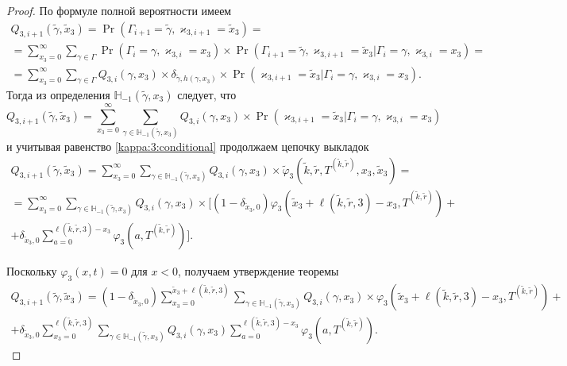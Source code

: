 \documentclass[a4paper,12pt,russian]{extarticle}
\begin{document}
\begin{proof}
По формуле полной вероятности имеем
\begin{multline*}
Q_{3,i+1}(\tilde{\gamma},\tilde{x}_3) = \Pr(\Gamma_{i+1}=\tilde{\gamma}, \varkappa_{3,i+1}=\tilde{x}_3) = \\
= \sum_{x_3=0}^{\infty}\sum_{\gamma \in \Gamma} \Pr(\Gamma_{i}=\gamma, \varkappa_{3,i}=x_3) \times \Pr(\Gamma_{i+1}=\tilde{\gamma}, \varkappa_{3,i+1}=\tilde{x}_3 | \Gamma_{i}=\gamma, \varkappa_{3,i}=x_3) =  \\ 
= \sum_{x_3=0}^{\infty}\sum_{\gamma \in \Gamma} Q_{3,i}(\gamma,x_3) \times \delta_{\tilde{\gamma},h(\gamma,x_3)}\times
\Pr(\varkappa_{3,i+1}=\tilde{x}_3 | \Gamma_{i}=\gamma, \varkappa_{3,i}=x_3).
\end{multline*}
Тогда из определения $ {\mathbb H}_{-1}(\tilde{\gamma},x_3)$ следует, что 
\begin{equation*}
Q_{3,i+1}(\tilde{\gamma},\tilde{x}_3) =\sum_{x_3=0}^{\infty}\sum_{\gamma \in {\mathbb H}_{-1}(\tilde{\gamma},x_3)} Q_{3,i}(\gamma,x_3) \times 
\Pr(\varkappa_{3,i+1}=\tilde{x}_3 | \Gamma_{i}=\gamma, \varkappa_{3,i}=x_3)
\end{equation*}
и учитывая равенство \eqref{kappa:3:conditional} продолжаем цепочку выкладок
\begin{multline*}
Q_{3,i+1}(\tilde{\gamma},\tilde{x}_3)= \sum_{x_3=0}^{\infty}\sum_{\gamma \in {\mathbb H}_{-1}(\tilde{\gamma},x_3)} Q_{3,i}(\gamma,x_3) \times 
\tilde{\varphi}_3(\tilde{k},\tilde{r}, T^{(\tilde{k},\tilde{r})},x_3,\tilde{x}_3) = \\
= \sum_{x_3=0}^{\infty}\sum_{\gamma \in {\mathbb H}_{-1}(\tilde{\gamma},x_3)} Q_{3,i}(\gamma,x_3) \times 
[ (1-\delta_{\tilde{x}_3,0})\varphi_3(\tilde{x}_3 + \ell(\tilde{k},\tilde{r},3) - x_3,T^{(\tilde{k},\tilde{r})}) + \\ 
+\delta_{\tilde{x}_3,0} \sum_{a=0}^{\ell(\tilde{k},\tilde{r},3)-x_3}\varphi_3(a,T^{(\tilde{k},\tilde{r})})].
\end{multline*}

Поскольку  $\varphi_3(x,t)=0$ для $x<0$, получаем утверждение теоремы
\begin{multline*}
Q_{3,i+1}(\tilde{\gamma},\tilde{x}_3)= (1-\delta_{\tilde{x}_3,0}) \sum_{x_3=0}^{\tilde{x}_3 +  \ell(\tilde{k},\tilde{r},3)}\sum_{\gamma \in {\mathbb H}_{-1}(\tilde{\gamma},x_3)} Q_{3,i}(\gamma,x_3) \times 
\varphi_3(\tilde{x}_3 + \ell(\tilde{k},\tilde{r},3) - x_3,T^{(\tilde{k},\tilde{r})}) + \\
+ \delta_{\tilde{x}_3,0} \sum_{x_3=0}^{\ell(\tilde{k},\tilde{r},3)}\sum_{\gamma \in {\mathbb H}_{-1}(\tilde{\gamma},x_3)} Q_{3,i}(\gamma,x_3) \sum_{a=0}^{\ell(\tilde{k},\tilde{r},3) - x_3} \varphi_3(a,T^{(\tilde{k},\tilde{r})}).
\end{multline*}
\end{proof}
\end{document}
